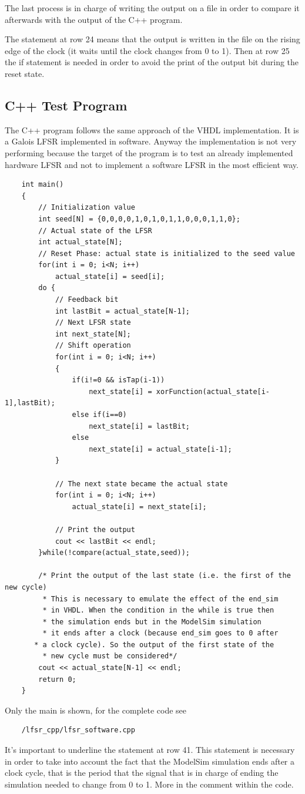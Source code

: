 \documentclass[a4paper]{report}
\begin{document}
\noindent The last process is in charge of writing the output on a file in order to compare it afterwards with the output of the C++ program.

\noindent The statement at row 24 means that the output is written in the file on the rising edge of the clock (it waits until the clock changes from 0 to 1). Then at row 25 the if statement is needed in order to avoid the print of the output bit during the reset state.

\subsection{C++ Test Program}
The C++ program follows the same approach of the VHDL implementation. It is a Galois LFSR implemented in software. Anyway the implementation is not very performing because the target of the program is to test an already implemented hardware LFSR and not to implement a software LFSR in the most efficient way.  
\lstset{ %
	language=C++ }
\begin{lstlisting}	
	int main()
	{
		// Initialization value
		int seed[N] = {0,0,0,0,1,0,1,0,1,1,0,0,0,1,1,0}; 
		// Actual state of the LFSR
		int actual_state[N];
		// Reset Phase: actual state is initialized to the seed value
		for(int i = 0; i<N; i++)
			actual_state[i] = seed[i];
		do {
			// Feedback bit
			int lastBit = actual_state[N-1];
			// Next LFSR state
			int next_state[N];
			// Shift operation
			for(int i = 0; i<N; i++)
			{
				if(i!=0 && isTap(i-1))
					next_state[i] = xorFunction(actual_state[i-1],lastBit);
				else if(i==0)
					next_state[i] = lastBit;
				else
					next_state[i] = actual_state[i-1];
			}
			
			// The next state became the actual state
			for(int i = 0; i<N; i++)
				actual_state[i] = next_state[i];
			
			// Print the output
			cout << lastBit << endl;
		}while(!compare(actual_state,seed));
		
		/* Print the output of the last state (i.e. the first of the new cycle)
		 * This is necessary to emulate the effect of the end_sim
		 * in VHDL. When the condition in the while is true then
		 * the simulation ends but in the ModelSim simulation
	 	 * it ends after a clock (because end_sim goes to 0 after
	   * a clock cycle). So the output of the first state of the 
	 	 * new cycle must be considered*/
		cout << actual_state[N-1] << endl;
		return 0;
	}
\end{lstlisting}

\noindent Only the main is shown, for the complete code see \begin{Verbatim}
	/lfsr_cpp/lfsr_software.cpp
\end{Verbatim}
It's important to underline the statement at row 41. This statement is necessary in order to take into account the fact that the ModelSim simulation ends after a clock cycle, that is the period that the signal that is in charge of ending the simulation needed to change from 0 to 1. More in the comment within the code.
\end{document}
